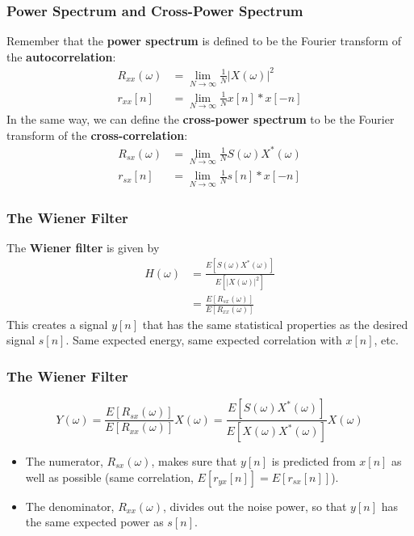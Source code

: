 \documentclass{beamer}
\begin{document}
\begin{frame}
  \frametitle{Power Spectrum and Cross-Power Spectrum}

  Remember that the {\bf power spectrum} is defined to be the Fourier
  transform of the {\bf autocorrelation}:
  \begin{align*}
    R_{xx}(\omega)&=\lim_{N\rightarrow\infty}\frac{1}{N} |X(\omega)|^2\\
    r_{xx}[n] &=\lim_{N\rightarrow\infty}\frac{1}{N} x[n]\ast x[-n]
  \end{align*}
  In the same way, we can define the {\bf cross-power spectrum} to be
  the Fourier transform of the {\bf cross-correlation}:
  \begin{align*}
    R_{sx}(\omega)&=\lim_{N\rightarrow\infty}\frac{1}{N} S(\omega)X^*(\omega)\\
    r_{sx}[n] &=\lim_{N\rightarrow\infty}\frac{1}{N} s[n]\ast x[-n]
  \end{align*}
\end{frame}
  
\begin{frame}
  \frametitle{The Wiener Filter}

  The {\bf Wiener filter} is given by
  \begin{align*}
    H(\omega)&=\frac{E\left[S(\omega)X^*(\omega)\right]}{E\left[|X(\omega)|^2\right]}\\
    &= \frac{E\left[R_{sx}(\omega)\right]}{E\left[R_{xx}(\omega)\right]}
  \end{align*}
  This creates a signal $y[n]$ that has the same statistical
  properties as the desired signal $s[n]$.  Same expected energy, same
  expected correlation with $x[n]$, etc.
\end{frame}

\begin{frame}
  \frametitle{The Wiener Filter}

  \begin{displaymath}
    Y(\omega) = \frac{E\left[R_{sx}(\omega)\right]}{E\left[R_{xx}(\omega)\right]} X(\omega)
    = \frac{E\left[S(\omega)X^*(\omega)\right]}{E\left[X(\omega)X^*(\omega)\right]} X(\omega)
  \end{displaymath}
  \begin{itemize}
  \item The numerator, $R_{sx}(\omega)$, makes sure that $y[n]$ is
    predicted from $x[n]$ as well as possible (same correlation,
    $E\left[r_{yx}[n]\right]=E\left[r_{sx}[n]\right]$).
  \item The denominator, $R_{xx}(\omega)$, divides out the noise
    power, so that $y[n]$ has the same expected power as $s[n]$.
  \end{itemize}
\end{frame}
\end{document}
